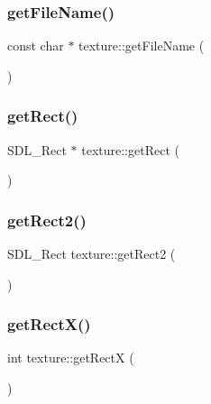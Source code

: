 \subsubsection{\texorpdfstring{get\+File\+Name()}{getFileName()}}
{\footnotesize\ttfamily const char $\ast$ texture\+::get\+File\+Name (\begin{DoxyParamCaption}{ }\end{DoxyParamCaption})}

\mbox{\label{classtexture_ad4d301a9c4256c47d573be6883149017}} 
\subsubsection{\texorpdfstring{get\+Rect()}{getRect()}}
{\footnotesize\ttfamily S\+D\+L\+\_\+\+Rect $\ast$ texture\+::get\+Rect (\begin{DoxyParamCaption}{ }\end{DoxyParamCaption})}

\mbox{\label{classtexture_a8ed99332b143351af89b37e2515e151c}} 
\subsubsection{\texorpdfstring{get\+Rect2()}{getRect2()}}
{\footnotesize\ttfamily S\+D\+L\+\_\+\+Rect texture\+::get\+Rect2 (\begin{DoxyParamCaption}{ }\end{DoxyParamCaption})}

\mbox{\label{classtexture_a847597e55d2ca794717fcf9535ff3716}} 
\subsubsection{\texorpdfstring{get\+Rect\+X()}{getRectX()}}
{\footnotesize\ttfamily int texture\+::get\+RectX (\begin{DoxyParamCaption}{ }\end{DoxyParamCaption})}

\mbox{\label{classtexture_a281785ea874f7636de4a19bea9d53cbb}} 
